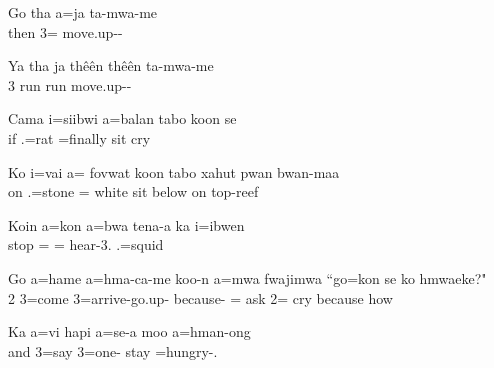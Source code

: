 \gll Go tha a=ja ta-mwa-me\\ then  3= move.up--\\ \glt {}

\z
\ea%

\gll Ya tha ja thêên thêên ta-mwa-me\\ 3   run run move.up--\\ \glt {}

\z
\ea%

\gll Cama i=siibwi a=balan tabo koon se\\ if .=rat =finally sit  cry\\ \glt {}

\z
\ea%

\gll Ko i=vai a= fovwat koon tabo xahut pwan bwan-maa\\ on .=stone = white  sit below on top-reef\\ \glt {}

\z
\ea%

\gll Koin a=kon a=bwa tena-a ka i=ibwen\\ stop = = hear-3.  .=squid\\ \glt {}

\z
\ea%

\gll Go a=hame a=hma-ca-me koo-n a=mwa fwajimwa ``go=kon se ko hmwaeke?"\\ 2 3=come 3=arrive-go.up- because- = ask 2= cry because how\\ \glt {}

\z
\ea%

\gll Ka a=vi hapi a=se-a moo a=hman-ong\\ and 3=say  3=one- stay =hungry-.\\ \glt {}

